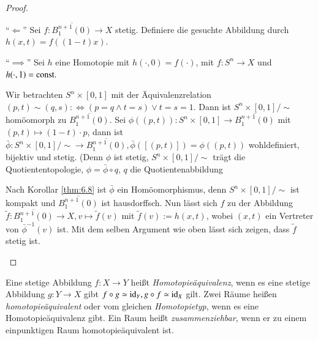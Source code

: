 \documentclass[a4paper,10pt]{scrartcl}
\begin{document}
\begin{proof}
 \begin{seg}{"`$\Longleftarrow$"'}
  Sei $f: \overline{B_{1}^{n+1}(0)}\to X$ stetig. Definiere die gesuchte Abbildung durch $h(x,t)=f((1-t)x)$.
 \end{seg}
 
\begin{seg}{"`$\implies$"'}
 Sei $h$ eine Homotopie mit $h(\cdot, 0)=f(\cdot)$, mit $f:S^n \to X$ und $h(\cdot, 1)=\text{const}.$
\begin{figure}[H]
\centering
  
\caption{}
\end{figure}
Wir betrachten $S^n\times[0,1]$ mit der Äquivalenzrelation $(p,t)\sim (q,s) :\iff (p=q \land t=s) \lor t=s=1$. Dann ist $S^n\times[0,1]/\sim$ homöomorph zu $\overline{B_1^{n+1}(0)}$. Sei $\phi ((p,t)):S^n\times[0,1]\to \overline{B_1^{n+1}(0)}$ mit $(p,t)\mapsto (1-t)\cdot p$, dann ist $\bar \phi: S^n \times[0,1]/\sim \to \overline{B_1^{n+1}(0)}, \bar \phi([(p,t)])=\phi((p,t))$ wohldefiniert, bijektiv und stetig. (Denn $\phi$ ist stetig, $S^n\times [0,1]/\sim$ trägt die Quotiententopologie, $\phi=\bar \phi \circ q $, $q$ die Quotientenabbildung\\
\begin{center}
\end{center}

Nach Korollar \ref{thm:6.8} ist $\bar \phi$ ein Homöomorphismus, denn $S^n\times [0,1]/\sim$ ist kompakt und $\overline{B_1^{n+1}(0)}$ ist hausdorffsch. Nun lässt sich $f$ zu der Abbildung $\tilde f: \overline{B_1^{n+1}(0)}\to X, v\mapsto \tilde f(v)$ mit $\tilde f(v):= h(x,t)$,
wobei $(x,t)$ ein Vertreter von $\bar \phi^{-1}(v)$ ist. Mit dem selben Argument wie oben lässt sich zeigen, dass $\tilde f$ stetig ist.
\end{seg}
\end{proof}
\begin{df}
 Eine stetige Abbildung $f: X\to Y$ heißt \emph{Homotopieäquivalenz}, wenn es eine stetige Abbildung $g: Y\to X$ gibt $f\circ g \simeq \operatorname{id}_Y, g\circ f \simeq \operatorname{id}_X$ gilt. Zwei
Räume heißen \emph{homotopieäquivalent} oder vom gleichen \emph{Homotopietyp}, wenn es eine Homotopieäquivalenz gibt. Ein Raum heißt \emph{zusammenziehbar}, wenn er zu einem einpunktigen Raum homotopieäquivalent ist.
\end{df}
\end{document}
